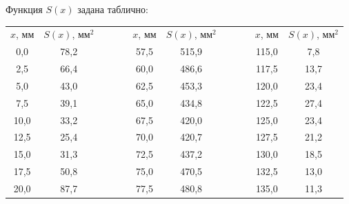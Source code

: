 		\newpage
		Функция $S(x)$ задана таблично:
		\begin{table}[h!]
			\centering
			\begin{tabular}{|c|c|ccc|c|c|ccccc}
				\cline{1-2} \cline{6-7} \cline{11-12}
				$x$, мм & $S(x)$, мм$^2$ &  &  &  & $x$, мм & $S(x)$, мм$^2$ &  &  & \multicolumn{1}{c|}{} & \multicolumn{1}{c|}{$x$, мм} & \multicolumn{1}{c|}{$S(x)$, мм$^2$} \\ \cline{1-2} \cline{6-7} \cline{11-12} 
				0,0     & 78,2           &  &  &  & 57,5    & 515,9          &  &  & \multicolumn{1}{c|}{} & \multicolumn{1}{c|}{115,0}   & \multicolumn{1}{c|}{7,8}            \\ \cline{1-2} \cline{6-7} \cline{11-12} 
				2,5     & 66,4           &  &  &  & 60,0    & 486,6          &  &  & \multicolumn{1}{c|}{} & \multicolumn{1}{c|}{117,5}   & \multicolumn{1}{c|}{13,7}           \\ \cline{1-2} \cline{6-7} \cline{11-12} 
				5,0     & 43,0           &  &  &  & 62,5    & 453,3          &  &  & \multicolumn{1}{c|}{} & \multicolumn{1}{c|}{120,0}   & \multicolumn{1}{c|}{23,4}           \\ \cline{1-2} \cline{6-7} \cline{11-12} 
				7,5     & 39,1           &  &  &  & 65,0    & 434,8          &  &  & \multicolumn{1}{c|}{} & \multicolumn{1}{c|}{122,5}   & \multicolumn{1}{c|}{27,4}           \\ \cline{1-2} \cline{6-7} \cline{11-12} 
				10,0    & 33,2           &  &  &  & 67,5    & 420,0          &  &  & \multicolumn{1}{c|}{} & \multicolumn{1}{c|}{125,0}   & \multicolumn{1}{c|}{23,4}           \\ \cline{1-2} \cline{6-7} \cline{11-12} 
				12,5    & 25,4           &  &  &  & 70,0    & 420,7          &  &  & \multicolumn{1}{c|}{} & \multicolumn{1}{c|}{127,5}   & \multicolumn{1}{c|}{21,2}           \\ \cline{1-2} \cline{6-7} \cline{11-12} 
				15,0    & 31,3           &  &  &  & 72,5    & 437,2          &  &  & \multicolumn{1}{c|}{} & \multicolumn{1}{c|}{130,0}   & \multicolumn{1}{c|}{18,5}           \\ \cline{1-2} \cline{6-7} \cline{11-12} 
				17,5    & 50,8           &  &  &  & 75,0    & 470,5          &  &  & \multicolumn{1}{c|}{} & \multicolumn{1}{c|}{132,5}   & \multicolumn{1}{c|}{13,0}           \\ \cline{1-2} \cline{6-7} \cline{11-12} 
				20,0    & 87,7           &  &  &  & 77,5    & 480,8          &  &  & \multicolumn{1}{c|}{} & \multicolumn{1}{c|}{135,0}   & \multicolumn{1}{c|}{11,3}           \\ \cline{1-2} \cline{6-7} \cline{11-12} 

\end{tabular}
\end{table}
